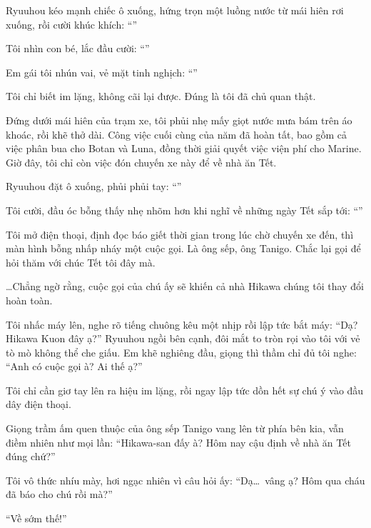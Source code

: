 \documentclass[../main.tex]{subfiles}
\begin{document}
Ryuuhou kéo mạnh chiếc ô xuống, hứng trọn một luồng nước từ mái hiên rơi xuống, rồi cười khúc khích: ``''

Tôi nhìn con bé, lắc đầu cười: ``''

Em gái tôi nhún vai, vẻ mặt tinh nghịch: ``''

Tôi chỉ biết im lặng, không cãi lại được. Đúng là tôi đã chủ quan thật.

Đứng dưới mái hiên của trạm xe, tôi phủi nhẹ mấy giọt nước mưa bám trên áo khoác, rồi khẽ thở dài. Công việc cuối cùng của năm đã hoàn tất, bao gồm cả việc phân bua cho Botan và Luna, đồng thời giải quyết việc viện phí cho Marine. Giờ đây, tôi chỉ còn việc đón chuyến xe này để về nhà ăn Tết.

Ryuuhou đặt ô xuống, phủi phủi tay: ``''

Tôi cười, đầu óc bỗng thấy nhẹ nhõm hơn khi nghĩ về những ngày Tết sắp tới: ``''

Tôi mở điện thoại, định đọc báo giết thời gian trong lúc chờ chuyến xe đến, thì màn hình bỗng nhấp nháy một cuộc gọi. Là ông sếp, ông Tanigo. Chắc lại gọi để hỏi thăm với chúc Tết tôi đây mà.

\dots Chẳng ngờ rằng, cuộc gọi của chú ấy sẽ khiến cả nhà Hikawa chúng tôi thay đổi hoàn toàn.

Tôi nhấc máy lên, nghe rõ tiếng chuông kêu một nhịp rồi lập tức bắt máy: ``Dạ? Hikawa Kuon đây ạ?'' Ryuuhou ngồi bên cạnh, đôi mắt to tròn rọi vào tôi với vẻ tò mò không thể che giấu. Em khẽ nghiêng đầu, giọng thì thầm chỉ đủ tôi nghe: ``Anh có cuộc gọi à? Ai thế ạ?''

Tôi chỉ cần giơ tay lên ra hiệu im lặng, rồi ngay lập tức dồn hết sự chú ý vào đầu dây điện thoại.

Giọng trầm ấm quen thuộc của ông sếp Tanigo vang lên từ phía bên kia, vẫn điềm nhiên như mọi lần: ``Hikawa-san đấy à? Hôm nay cậu định về nhà ăn Tết đúng chứ?''

Tôi vô thức nhíu mày, hơi ngạc nhiên vì câu hỏi ấy: ``Dạ\dots\ vâng ạ? Hôm qua cháu đã báo cho chú rồi mà?''

``Về sớm thế!''
\end{document}
